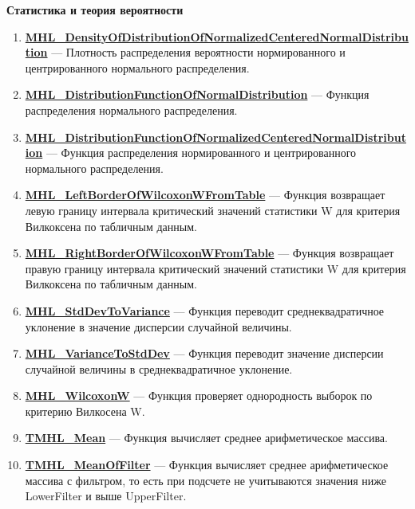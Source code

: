 \documentclass[a4paper,12pt]{article}
\begin{document}
\textbf{Статистика и теория вероятности}
\begin{enumerate}

\item \textbf{\hyperref[MHL_DensityOfDistributionOfNormalizedCenteredNormalDistribution]{MHL\_DensityOfDistributionOfNormalizedCenteredNormalDistribution}} --- Плотность распределения вероятности нормированного и центрированного нормального распределения.

\item \textbf{\hyperref[MHL_DistributionFunctionOfNormalDistribution]{MHL\_DistributionFunctionOfNormalDistribution}} --- Функция распределения нормального распределения.

\item \textbf{\hyperref[MHL_DistributionFunctionOfNormalizedCenteredNormalDistribution]{MHL\_DistributionFunctionOfNormalizedCenteredNormalDistribution}} --- Функция распределения нормированного и центрированного нормального распределения.

\item \textbf{\hyperref[MHL_LeftBorderOfWilcoxonWFromTable]{MHL\_LeftBorderOfWilcoxonWFromTable}} --- Функция возвращает левую границу интервала критический значений статистики W для критерия Вилкоксена по табличным данным.

\item \textbf{\hyperref[MHL_RightBorderOfWilcoxonWFromTable]{MHL\_RightBorderOfWilcoxonWFromTable}} --- Функция возвращает правую границу интервала критический значений статистики W для критерия Вилкоксена по табличным данным.

\item \textbf{\hyperref[MHL_StdDevToVariance]{MHL\_StdDevToVariance}} --- Функция переводит среднеквадратичное уклонение в значение дисперсии случайной величины.

\item \textbf{\hyperref[MHL_VarianceToStdDev]{MHL\_VarianceToStdDev}} --- Функция переводит значение дисперсии случайной величины в среднеквадратичное уклонение.

\item \textbf{\hyperref[MHL_WilcoxonW]{MHL\_WilcoxonW}} --- Функция проверяет однородность выборок по критерию Вилкосена W.

\item \textbf{\hyperref[TMHL_Mean]{TMHL\_Mean}} --- Функция вычисляет среднее арифметическое массива.

\item \textbf{\hyperref[TMHL_MeanOfFilter]{TMHL\_MeanOfFilter}} --- Функция вычисляет среднее арифметическое массива с фильтром, то есть при подсчете не учитываются значения ниже LowerFilter и выше UpperFilter.


\end{enumerate}
\end{document}
